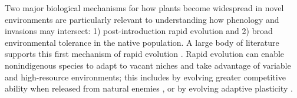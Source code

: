 \documentclass[11pt]{article}\usepackage[]{graphicx}\usepackage[]{color}
\begin{document}
Two major biological mechanisms for how plants become widespread in novel environments are particularly relevant to understanding how phenology and invasions may intersect: 1) post-introduction rapid evolution and 2) broad environmental tolerance in the native population. A large body of literature supports this first mechanism of rapid evolution \parencite[e.g.,][]{Reznick2001, Prentis2008,Colautti2015,Lee2002invasion,Clements2011}.  Rapid evolution can enable nonindigenous species to adapt to vacant niches and take advantage of variable and high-resource environments; this includes by evolving greater competitive ability when released from natural enemies \parencites[i.e., enemy release hypothesis]{Blossey1995,Bossdorf2005}[though this hypothesis is likely less explanatory than is often assumed][]{Colautti2004}, or by evolving adaptive plasticity \parencite{Richards2006}. %
\end{document}
